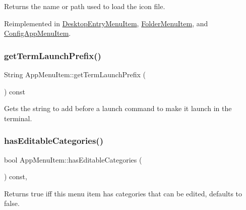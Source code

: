 \begin{DoxyReturn}{Returns}
the name or path used to load the icon file. 
\end{DoxyReturn}


Reimplemented in \mbox{\hyperlink{classDesktopEntryMenuItem_ad65fc5b9d5d94280ab02708cedbf742c}{Desktop\+Entry\+Menu\+Item}}, \mbox{\hyperlink{classFolderMenuItem_a0f78f25c3d73abbb3179613b1f40467b}{Folder\+Menu\+Item}}, and \mbox{\hyperlink{classConfigAppMenuItem_a63f0a259553e03a6f33336777c753f74}{Config\+App\+Menu\+Item}}.

\mbox{\label{classAppMenuItem_a69db4f9d28f63428fcdfb283f77aeb5f}} 
\subsubsection{\texorpdfstring{get\+Term\+Launch\+Prefix()}{getTermLaunchPrefix()}}
{\footnotesize\ttfamily String App\+Menu\+Item\+::get\+Term\+Launch\+Prefix (\begin{DoxyParamCaption}{ }\end{DoxyParamCaption}) const\hspace{0.3cm}{\ttfamily [protected]}}

Gets the string to add before a launch command to make it launch in the terminal. \mbox{\label{classAppMenuItem_aa9656d7c1a2dd93bd02f119c0efbb2e0}} 
\subsubsection{\texorpdfstring{has\+Editable\+Categories()}{hasEditableCategories()}}
{\footnotesize\ttfamily bool App\+Menu\+Item\+::has\+Editable\+Categories (\begin{DoxyParamCaption}{ }\end{DoxyParamCaption}) const\hspace{0.3cm}{\ttfamily [protected]}, {\ttfamily [virtual]}}

\begin{DoxyReturn}{Returns}
true iff this menu item has categories that can be edited, defaults to false. 
\end{DoxyReturn}


